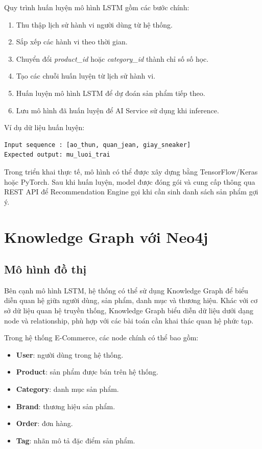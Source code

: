 \documentclass[../main.tex]{subfiles}
\begin{document}
Quy trình huấn luyện mô hình LSTM gồm các bước chính:

\begin{enumerate}
    \item Thu thập lịch sử hành vi người dùng từ hệ thống.
    \item Sắp xếp các hành vi theo thời gian.
    \item Chuyển đổi \textit{product\_id} hoặc \textit{category\_id} thành chỉ số số học.
    \item Tạo các chuỗi huấn luyện từ lịch sử hành vi.
    \item Huấn luyện mô hình LSTM để dự đoán sản phẩm tiếp theo.
    \item Lưu mô hình đã huấn luyện để AI Service sử dụng khi inference.
\end{enumerate}

Ví dụ dữ liệu huấn luyện:

\begin{verbatim}
Input sequence : [ao_thun, quan_jean, giay_sneaker]
Expected output: mu_luoi_trai
\end{verbatim}

Trong triển khai thực tế, mô hình có thể được xây dựng bằng TensorFlow/Keras hoặc PyTorch. Sau khi huấn luyện, model được đóng gói và cung cấp thông qua REST API để Recommendation Engine gọi khi cần sinh danh sách sản phẩm gợi ý.

\section{Knowledge Graph với Neo4j}

\subsection{Mô hình đồ thị}

Bên cạnh mô hình LSTM, hệ thống có thể sử dụng Knowledge Graph để biểu diễn quan hệ giữa người dùng, sản phẩm, danh mục và thương hiệu. Khác với cơ sở dữ liệu quan hệ truyền thống, Knowledge Graph biểu diễn dữ liệu dưới dạng node và relationship, phù hợp với các bài toán cần khai thác quan hệ phức tạp.

Trong hệ thống E-Commerce, các node chính có thể bao gồm:

\begin{itemize}
    \item \textbf{User}: người dùng trong hệ thống.
    \item \textbf{Product}: sản phẩm được bán trên hệ thống.
    \item \textbf{Category}: danh mục sản phẩm.
    \item \textbf{Brand}: thương hiệu sản phẩm.
    \item \textbf{Order}: đơn hàng.
    \item \textbf{Tag}: nhãn mô tả đặc điểm sản phẩm.
\end{itemize}
\end{document}
